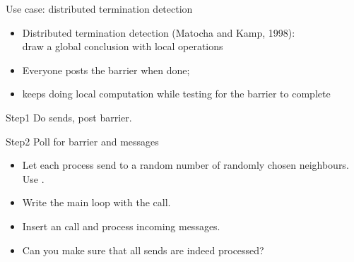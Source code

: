 \begin{numberedframe}{Use case: distributed termination detection}
  \begin{itemize}
  \item Distributed termination detection (Matocha and Kamp, 1998):\\
    draw a global conclusion with local operations
  \item Everyone posts the barrier when done;
  \item keeps doing local computation while testing for the barrier to
    complete
  \end{itemize}
\end{numberedframe}


\begin{numberedframe}{Step1}
  Do sends, post barrier.
\end{numberedframe}

\begin{numberedframe}{Step2}
  Poll for barrier and messages
\end{numberedframe}

\begin{exerciseframe}[ibarrierupdate]
  \begin{itemize}
  \item Let each process send to a random number of randomly chosen
    neighbours. Use .
  \item Write the main loop with the  call.
  \item Insert an  call and process incoming messages.
  \item Can you make sure that all sends are indeed processed?
  \end{itemize}
\end{exerciseframe}

\begin{comment}
  \begin{numberedframe}{Problem with `progress'}
    \begin{itemize}
    \item Problem: \indexmpishow{MPI_Test} is local
    \item Something needs to force the barrier information to propagate
    \item Solution: force progress with \indexmpishow{MPI_Iprobe}
    \item Frowny face: barrier completion takes much longer than you'd expect.
    \end{itemize}
  \end{numberedframe}
\end{comment}

\endinput

\begin{numberedframe}{}
\begin{lstlisting}
  
\end{lstlisting}
\end{numberedframe}

